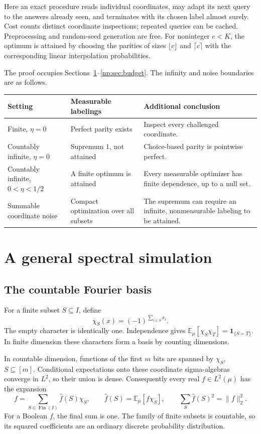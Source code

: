 \documentclass[11pt,a4paper]{article}
\theoremstyle{definition}
\theoremstyle{remark}
\newcommand{\E}{\mathbb E}
\newcommand{\Fin}{\operatorname{Fin}}
\newcommand{\one}{\mathbf 1}
\begin{document}
Here an exact procedure reads individual coordinates, may adapt its next
query to the answers already seen, and terminates with its chosen label
almost surely. Cost counts distinct coordinate inspections; repeated
queries can be cached. Preprocessing and random-seed generation are free.
For noninteger \(c<K\), the optimum is attained by choosing the parities
of sizes \(\lfloor c\rfloor\) and \(\lceil c\rceil\) with the corresponding
linear interpolation probabilities.

The proof occupies Sections~\ref{np:sec:spectral}--\ref{np:sec:budget}.
The infinity and noise boundaries are as follows.

\begin{center}
\small
\begin{tabular}{@{}L{.24\textwidth}L{.30\textwidth}L{.36\textwidth}@{}}
\toprule
Setting & Measurable labelings & Additional conclusion\\
\midrule
Finite, \(\eta=0\)& Perfect parity exists & Inspect every challenged coordinate.\\
Countably infinite, \(\eta=0\)& Supremum \(1\), not attained
 & Choice-based parity is pointwise perfect.\\
Countably infinite, \(0<\eta<1/2\)& A finite optimum is attained
 & Every measurable optimizer has finite dependence, up to a null set.\\
Summable coordinate noise& Compact optimization over all subsets
 & The supremum can require an infinite, nonmeasurable labeling to be attained.\\
\bottomrule
\end{tabular}
\end{center}

\section{A general spectral simulation}\label{np:sec:spectral}

\subsection{The countable Fourier basis}

For a finite subset \(S\subseteq I\), define
\[
 \chi_S(x)=(-1)^{\sum_{i\in S}x_i}.
\]
The empty character is identically one. Independence gives
\(\E_\mu[\chi_S\chi_T]=\one_{\{S=T\}}\). In finite dimension these
characters form a basis by counting dimensions.

In countable dimension, functions of the first \(m\) bits are spanned by
\(\chi_S\), \(S\subseteq[m]\). Conditional expectations onto these
coordinate sigma-algebras converge in \(L^2\), so their union is dense.
Consequently every real \(f\in L^2(\mu)\) has the expansion
\[
 f=\sum_{S\in\Fin(I)}\widehat f(S)\chi_S,\qquad
 \widehat f(S)=\E_\mu[f\chi_S],\qquad
 \sum_S\widehat f(S)^2=\|f\|_2^2.
\]
For a Boolean \(f\), the final sum is one. The family of finite subsets is
countable, so its squared coefficients are an ordinary discrete
probability distribution.
\end{document}
